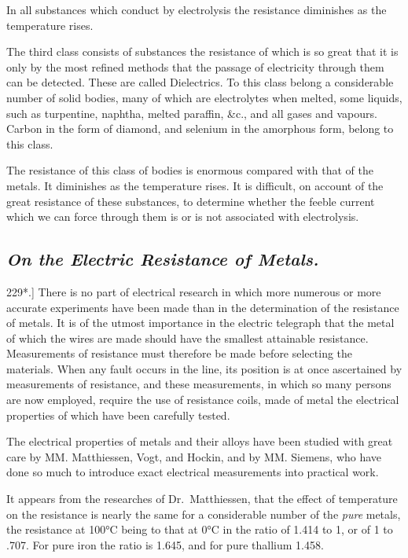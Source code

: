 \documentclass[12pt,oneside]{book}[2021/10/04]
\newcommand{\Heading}{\centering\normalfont}
\newcommand{\Subsection}[1]{\subsection*{\normalsize\Heading\itshape #1}}
\newcommand{\Runhead}[1]{\fancyhead[C]{\iffloatpage{}{\small#1}}}
\newcommand{\article}[1]{\phantomsection \label{art:#1}{#1.]}}
\newcommand{\¬}{\hphantom{0}}
\begin{document}
In all substances which conduct by electrolysis the resistance
diminishes as the temperature rises.

The third class consists of substances the resistance of which is
so great that it is only by the most refined methods that the
passage of electricity through them can be detected. These are
called Dielectrics. To this class belong a considerable number
of solid bodies, many of which are electrolytes when melted, some
liquids, such as turpentine, naphtha, melted paraffin, \&c., and all
gases and vapours. Carbon in the form of diamond, and selenium
in the amorphous form, belong to this class.

The resistance of this class of bodies is enormous compared with
that of the metals. It diminishes as the temperature rises. It
is difficult, on account of the great resistance of these substances,
to determine whether the feeble current which we can force through
them is or is not associated with electrolysis.

\Subsection{On the Electric Resistance of Metals.}

\article{229*} There is no part of electrical research in which more
numerous or more accurate experiments have been made than in
the determination of the resistance of metals. It is of the utmost
importance in the electric telegraph that the metal of which the
wires are made should have the smallest attainable resistance.
Measurements of resistance must therefore be made before selecting
the materials. When any fault occurs in the line, its position is
at once ascertained by measurements of resistance, and these measurements,
in which so many persons are now employed, require
the use of resistance coils, made of metal the electrical properties
of which have been carefully tested.
\Runhead{RESISTANCE OF METALS.}

The electrical properties of metals and their alloys have been
studied with great care by MM. Matthiessen, Vogt, and Hockin,
and by MM. Siemens, who have done so much to introduce exact
electrical measurements into practical work.

It appears from the researches of Dr.\ Matthiessen, that the effect
of temperature on the resistance is nearly the same for a considerable
number of the \textit{pure} metals, the resistance at 100°C being to that
at 0°C in the ratio of 1.414 to 1, or of 1 to .707. For pure iron
the ratio is 1.645, and for pure thallium 1.458.
\end{document}

